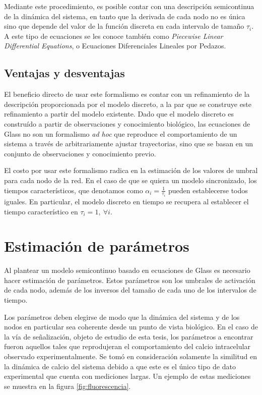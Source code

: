 Mediante este procedimiento, es posible contar con una descripción semicontinua de la dinámica del sistema, en tanto que la derivada de cada nodo no es única sino que depende del valor de la función discreta en cada intervalo de tamaño $\tau_i$. A este tipo de ecuaciones se les conoce también como \emph{Piecewise Linear Differential Equations}, o Ecuaciones Diferenciales Lineales por Pedazos.

\subsection{Ventajas y desventajas}

El beneficio directo de usar este formalismo es contar con un refinamiento de la descripción proporcionada por el modelo discreto, a la par que se construye este refinamiento a partir del modelo existente. Dado que el modelo discreto es construído a partir de observaciones y conocimiento biológico, las ecuaciones de Glass no son un formalismo \emph{ad hoc} que reproduce el comportamiento de un sistema a través de arbitrariamente ajustar trayectorias, sino que se basan en un conjunto de observaciones y conocimiento previo.

El costo por usar este formalismo radica en la estimación de los valores de umbral para cada nodo de la red. En el caso de que se quiera un modelo sincronizado, los tiempos característicos, que denotamos como $\alpha_i=\frac{1}{\tau_i}$ pueden establecerse todos iguales. En particular, el modelo discreto en tiempo se recupera al establecer el tiempo característico en $\tau_i = 1,\ \forall i$.

\section{Estimación de parámetros}

Al plantear un modelo semicontinuo basado en ecuaciones de Glass es necesario hacer estimación de parámetros. Estos parámetros son los umbrales de activación de cada nodo, además de los inversos del tamaño de cada uno de los intervalos de tiempo.

Los parámetros deben elegirse de modo que la dinámica del sistema y de los nodos en particular sea coherente desde un punto de vista biológico. En el caso de la vía de señalización, objeto de estudio de esta tesis, los parámetros a encontrar fueron aquellos tales que reprodujeran el comportamiento del calcio intracelular observado experimentalmente. Se tomó en consideración solamente la similitud en la dinámica de calcio del sistema debido a que este es el único tipo de dato experimental que cuenta con mediciones largas. Un ejemplo de estas mediciones se muestra en la figura \ref{fig:fluorescencia}.

